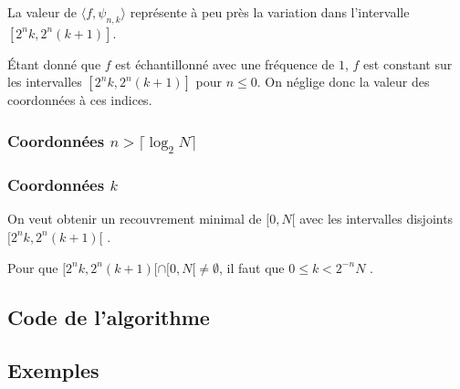 \documentclass[]{article}
\theoremstyle{remark}
\theoremstyle{definition}
\begin{document}
La valeur de $\langle f,\psi_{n,k}\rangle$ représente à peu près la variation dans l'intervalle $[2^{n}k,2^{n}(k+1)]$.

Étant donné que $f$ est échantillonné avec une fréquence de $1$, $f$ est constant sur les intervalles $[2^{n}k,2^{n}(k+1)]$ pour $n\le 0$. On néglige donc la valeur des coordonnées à ces indices.

\subsubsection{Coordonnées $n > \lceil\log_2 N\rceil$}

\subsubsection{Coordonnées $k$}

On veut obtenir un recouvrement minimal de $[0,N[$ avec les intervalles disjoints $[2^{n}k,2^{n}(k+1)[$ .

Pour que $[2^{n}k,2^{n}(k+1)[\cap[0,N[\neq\emptyset$, il faut que $0\le k< 2^{-n}N$ .

\subsection{Code de l'algorithme}

\subsection{Exemples}
\end{document}
